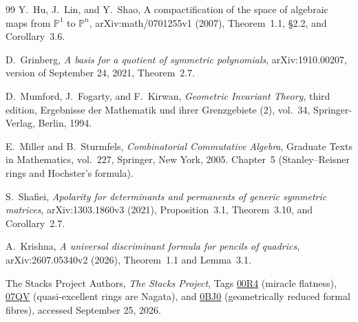 \documentclass[11pt,reqno]{amsart}
\numberwithin{equation}{section}
\theoremstyle{definition}\newtheorem{definition}[theorem]{Definition}
\theoremstyle{remark}\newtheorem{remark}[theorem]{Remark}
\newcommand{\Pj}{\mathbb P}\newcommand{\A}{\mathbb A}
\begin{document}
\begin{thebibliography}{99}
Y.~Hu, J.~Lin, and Y.~Shao, A compactification of the space of
algebraic maps from $\Pj^1$ to $\Pj^n$,
arXiv:math/0701255v1 (2007), Theorem~1.1,
\S2.2, and Corollary~3.6.


D.~Grinberg, \emph{A basis for a quotient of symmetric polynomials},
arXiv:1910.00207, version of September 24, 2021, Theorem~2.7.

D.~Mumford, J.~Fogarty, and F.~Kirwan,
\emph{Geometric Invariant Theory}, third edition,
Ergebnisse der Mathematik und ihrer Grenzgebiete (2), vol.~34,
Springer-Verlag, Berlin, 1994.

E.~Miller and B.~Sturmfels, \emph{Combinatorial Commutative Algebra},
Graduate Texts in Mathematics, vol.~227, Springer, New York, 2005.
Chapter~5 (Stanley--Reisner rings and Hochster's formula).

S.~Shafiei, \emph{Apolarity for determinants and permanents of generic
symmetric matrices}, arXiv:1303.1860v3 (2021), Proposition~3.1,
Theorem~3.10, and Corollary~2.7.

A.~Krishna, \emph{A universal discriminant formula for pencils of
quadrics}, arXiv:2607.05340v2 (2026), Theorem~1.1 and Lemma~3.1.

The Stacks Project Authors, \emph{The Stacks Project},
Tags \href{https://stacks.math.columbia.edu/tag/00R4}{00R4}
(miracle flatness),
\href{https://stacks.math.columbia.edu/tag/07QV}{07QV}
(quasi-excellent rings are Nagata), and
\href{https://stacks.math.columbia.edu/tag/0BJ0}{0BJ0}
(geometrically reduced formal fibres), accessed September 25, 2026.

\end{thebibliography}
\end{document}
